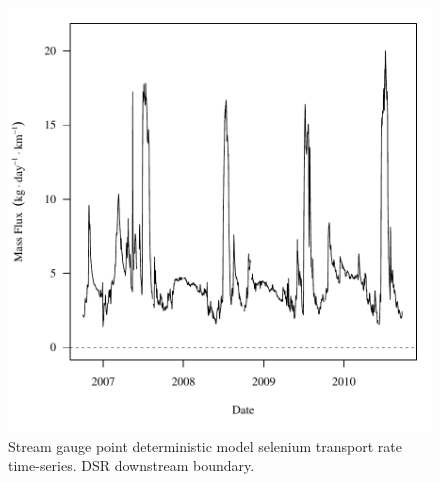 \begin{figure}[htbp]
	\begin{center}
	\includegraphics[width=6in]{"Figures/Results_DDSR/f D106C"}
	\caption{Stream gauge point deterministic model selenium transport rate time-series.  DSR downstream boundary.}
	\end{center}
\end{figure}
\newpage